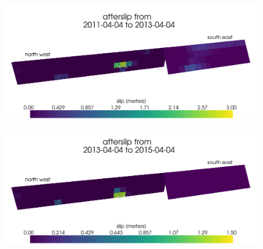 \documentclass[12pt]{article}
\begin{document}
\begin{figure}
\includegraphics[scale=0.1]{Figures/final_afterslip_1-3}
\centering 
\caption{}
\label{fig:FinalAfterslip2}
\end{figure} 

\begin{figure}
\includegraphics[scale=0.1]{Figures/final_afterslip_3-5}
\centering 
\caption{}
\label{fig:FinalAfterslip3}
\end{figure} 
\end{document}
